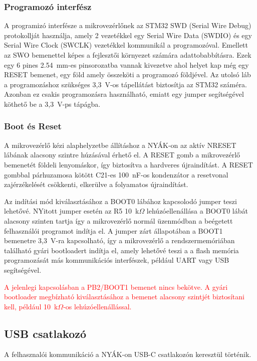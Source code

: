 \subsubsection{Programozó interfész}
A programizó interfésze a mikrovezérlőnek az STM32 SWD (Serial Wire Debug) protokollját használja,
amely 2 vezetékkel egy Serial Wire Data (SWDIO) és egy Serial Wire Clock (SWCLK) vezetékkel kommunikál a programozóval.
Emellett az SWO bemenettel képes a fejlesztői környezet számára adattobabbításra. 
Ezek egy 6 pines 2.54~mm-es pinsorozatba vannak kivezetve ahol helyet kap még egy
RESET bemenet, egy föld amely összeköti a programozó földjével.
Az utolsó láb a programozáshoz szükséges 3,3~V-os tápellátást biztosítja az STM32 száméra.
Azonban ez csakis programozásra használható, emiatt egy jumper segítségével köthető be a 3,3~V-ps
tápágba. 

\subsubsection{Boot és Reset}
A mikrovezérlő kézi alaphelyzetbe állításhoz a NYÁK-on az aktív NRESET lábának alacsony szintre húzásával
érhető el. A RESET gomb a mikrovezérlő bemenetét földeli lenyomáskor, így biztosítva a hardveres
újraindítást. A RESET gombbal párhuzamosa kötött C21-es 100~nF-os kondenzátor a resetvonal
zajérzékelését csökkenti, elkerülve a folyamatos újraindítást. 

Az indítási mód kiválasztásához a BOOT0 lábához kapcsolodó jumper teszi lehetővé. 
NYitott jumper esetén az R5 10~k$\Omega$ lehúzóellenállása a BOOT0 lábát alacsony szinten
tartja így a mikrovezérlő normál üzenmódban a beégetett felhasználói programot indítja el.
A jumper zárt állapotában a BOOT1 bemenetre 3,3~V-ra kapcsolható, így a mikrovezérlő
a rendszermemóriában található gyári bootloadert indítja el, amely lehetővé teszi a 
a flash memória programozását más kommunikációs interfészek, például UART vagy USB segítségével.

\textcolor{red}{A jelenlegi kapcsolásban a PB2/BOOT1
bemenet nincs bekötve. A gyári bootloader megbízható
kiválasztásához a bemenet alacsony szintjét biztosítani
kell, például 10~k$\Omega$-os lehúzóellenállással.}

\subsection{USB csatlakozó}
A felhasznalói kommunikáció a NYÁK-on USB-C csatlakozón keresztül történik.

